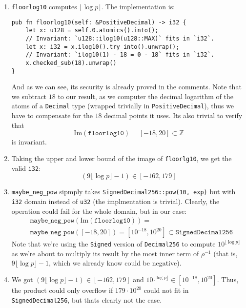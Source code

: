 \documentclass[11pt]{article}
\begin{document}
\begin{enumerate}[label=(\arabic*).]
    \item \texttt{floorlog10} computes $\lfloor\log p\rfloor$. The implementation is:
\begin{verbatim}
pub fn floorlog10(self: &PositiveDecimal) -> i32 {
    let x: u128 = self.0.atomics().into();
    // Invariant: `u128::ilog10(u128::MAX)` fits in `i32`.
    let x: i32 = x.ilog10().try_into().unwrap();
    // Invariant: `ilog10(1) - 18 = 0 - 18` fits in `i32`.
    x.checked_sub(18).unwrap()
}
\end{verbatim}
And as we can see, its security is already proved in the comments.
Note that we subtract $18$ to our result, as we computer the decimal
logarithm of the atoms of a \texttt{Decimal} type (wrapped trivially
in \texttt{PositiveDecimal}), thus we have to compensate for the $18$
decimal points it uses. Its also trivial to verify that 
\[
\text{Im}(\texttt{floorlog10}) =[-18, 20]\subset\mathbb Z
\]
is invariant.
    \item Taking the upper and lower bound of the image of \texttt{floorlg10},
        we get the valid \texttt{i32}:
        \[
            (9\lfloor\log p\rfloor - 1) \in[-162, 179]
        \]
    \item \texttt{maybe\_neg\_pow} sipmply takes \texttt{SignedDecimal256::pow(10, exp)}
        but with \texttt{i32} domain instead of \texttt{u32} (the implmentation is trivial).
        Clearly, the operation could fail for the whole domain, but in our case:
        \begin{equation*}
        \begin{split}
        &\texttt{maybe\_neg\_pow}(\text{Im}(\texttt{floorlog10}))=\\
        &\texttt{maybe\_neg\_pow}([-18, 20])
        = [10^{-18}, 10^{20}] \subset\texttt{SignedDecimal256}
        \end{split}
        \end{equation*}
        Note that we're using the \texttt{Signed} version of \texttt{Decimal256}
        to compute $10^{\lfloor\log p\rfloor}$ as we're about to multiply its
        result by the most inner term of $\rho^{-1}$ (that is, $9\lfloor\log
        p\rfloor - 1$, which we already know could be negative).
    \item We got $(9\lfloor\log p\rfloor - 1) \in[-162, 179]$ and
        $10^{\lfloor\log p\rfloor}\in[10^{-18}, 10^{20}]$. Thus,
        the product could only overflow if $179\cdot 10^{20}$ could not fit
        in \texttt{SignedDecimal256}, but thats clearly not the case.

\end{enumerate}
\end{document}
